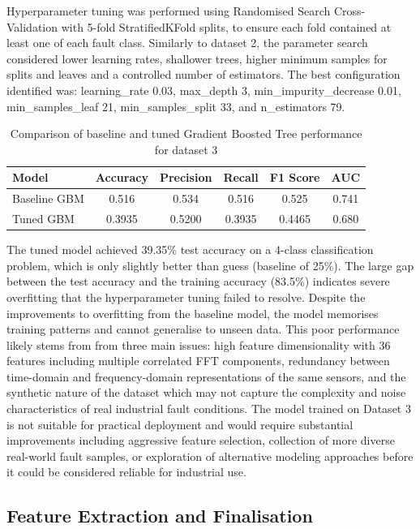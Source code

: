 \documentclass[11pt]{article}
\begin{document}
Hyperparameter tuning was performed using Randomised Search Cross-Validation with 5-fold StratifiedKFold splits, to ensure each fold contained at least one of each fault class. Similarly to dataset 2, the parameter search considered lower learning rates, shallower trees, higher minimum samples for splits and leaves and a controlled number of estimators. The best configuration identified was: learning\_rate 0.03, max\_depth 3, min\_impurity\_decrease 0.01, min\_samples\_leaf 21, min\_samples\_split 33, and n\_estimators 79.

\begin{table}[h!]
\centering
\begin{tabular}{l c c c c c}
\hline
\textbf{Model} & \textbf{Accuracy} & \textbf{Precision} & \textbf{Recall} & \textbf{F1 Score} & \textbf{AUC} \\
\hline
Baseline GBM & 0.516 & 0.534 & 0.516 & 0.525 & 0.741 \\
Tuned GBM & 0.3935 & 0.5200 & 0.3935 & 0.4465 & 0.680 \\
\hline
\end{tabular}
\caption{Comparison of baseline and tuned Gradient Boosted Tree performance for dataset 3}
\label{tab:gbm_dataset3}
\end{table}


The tuned model achieved 39.35\% test accuracy on a 4-class classification problem, which is only slightly better than guess (baseline of 25\%). The large gap between the test accuracy and the training accuracy (83.5\%) indicates severe overfitting that the hyperparameter tuning failed to resolve. Despite the improvements to overfitting from the baseline model, the model memorises training patterns and cannot generalise to unseen data. This poor performance likely stems from from three main issues: high feature dimensionality with 36 features including multiple correlated FFT components, redundancy between time-domain and frequency-domain representations of the same sensors, and the synthetic nature of the dataset which may not capture the complexity and noise characteristics of real industrial fault conditions. The model trained on Dataset 3 is not suitable for practical deployment and would require substantial improvements including aggressive feature selection, collection of more diverse real-world fault samples, or exploration of alternative modeling approaches before it could be considered reliable for industrial use.


\subsection{Feature Extraction and Finalisation}
\end{document}
